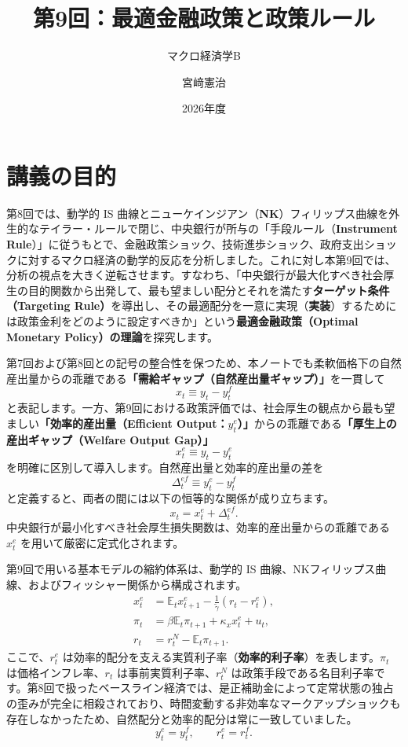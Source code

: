 \documentclass[
  japanese,
  lualatex,
  ja=standard,
  12pt,
  a4paper]{ltjsarticle}
\title{第9回：最適金融政策と政策ルール}
\subtitle{マクロ経済学B}
\author{宮﨑憲治}
\date{2026年度}
\renewcommand*\contentsname{目次}
\newcommand\contentsname{目次}
\begin{document}
\maketitle

\renewcommand*\contentsname{目次}
{
\setcounter{tocdepth}{3}
\tableofcontents
}

\clearpage

\section{講義の目的}\label{ux8b1bux7fa9ux306eux76eeux7684}

第8回では、動学的 IS
曲線とニューケインジアン（\textbf{NK}）フィリップス曲線を外生的なテイラー・ルールで閉じ、中央銀行が所与の「手段ルール（\textbf{Instrument
Rule}）」に従うもとで、金融政策ショック、技術進歩ショック、政府支出ショックに対するマクロ経済の動学的反応を分析しました。これに対し本第9回では、分析の視点を大きく逆転させます。すなわち、「中央銀行が最大化すべき社会厚生の目的関数から出発して、最も望ましい配分とそれを満たす\textbf{ターゲット条件（Targeting
Rule）}を導出し、その最適配分を一意に実現（\textbf{実装}）するためには政策金利をどのように設定すべきか」という\textbf{最適金融政策（Optimal
Monetary Policy）の理論}を探究します。

第7回および第8回との記号の整合性を保つため、本ノートでも柔軟価格下の自然産出量からの乖離である\textbf{「需給ギャップ（自然産出量ギャップ）」}を一貫して
\[
x_t\equiv y_t-y_t^f
\]
と表記します。一方、第9回における政策評価では、社会厚生の観点から最も望ましい\textbf{「効率的産出量（Efficient
Output：\(y_t^e\)）」}からの乖離である\textbf{「厚生上の産出ギャップ（Welfare
Output Gap）」} \[
x_t^e\equiv y_t-y_t^e
\] を明確に区別して導入します。自然産出量と効率的産出量の差を \[
\Delta_t^{ef}\equiv y_t^e-y_t^f
\] と定義すると、両者の間には以下の恒等的な関係が成り立ちます。 \[
x_t=x_t^e+\Delta_t^{ef}.
\]
中央銀行が最小化すべき社会厚生損失関数は、効率的産出量からの乖離である
\(x_t^e\) を用いて厳密に定式化されます。

第9回で用いる基本モデルの縮約体系は、動学的 IS
曲線、NKフィリップス曲線、およびフィッシャー関係から構成されます。 \[
\begin{aligned}
x_t^e
&=
\mathbb{E}_t x_{t+1}^e
-\frac{1}{\tilde{\gamma}}(r_t-r_t^e),\\
\pi_t
&=
\beta\mathbb{E}_t\pi_{t+1}
+\kappa_x x_t^e+u_t,\\
r_t
&=
r_t^N-\mathbb{E}_t\pi_{t+1}.
\end{aligned}
\] ここで、\(r_t^e\)
は効率的配分を支える実質利子率（\textbf{効率的利子率}）を表します。\(\pi_t\)
は価格インフレ率、\(r_t\) は事前実質利子率、\(r_t^N\)
は政策手段である名目利子率です。第8回で扱ったベースライン経済では、是正補助金によって定常状態の独占の歪みが完全に相殺されており、時間変動する非効率なマークアップショックも存在しなかったため、自然配分と効率的配分は常に一致していました。
\[
y_t^e=y_t^f,
\qquad
r_t^e=r_t^f.
\]
\end{document}
